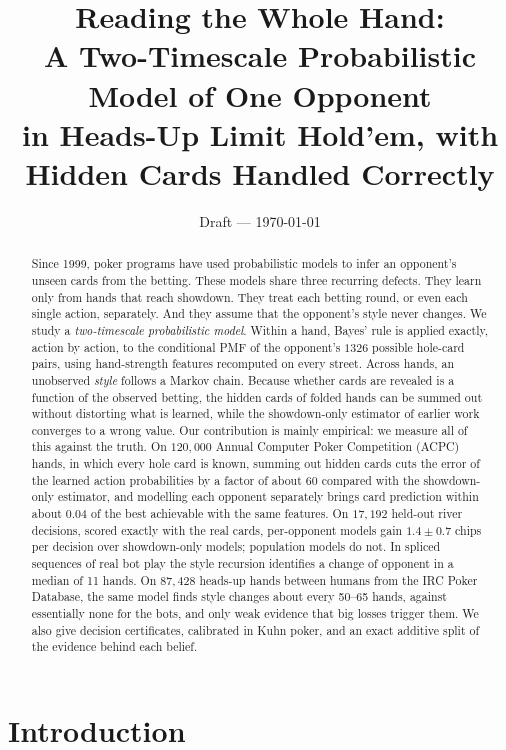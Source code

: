 \documentclass[11pt,a4paper]{article}
\title{Reading the Whole Hand:\\
A Two-Timescale Probabilistic Model of One Opponent\\
in Heads-Up Limit Hold'em, with Hidden Cards Handled Correctly}
\author{Draft --- \today}
\date{}
\newcommand{\1}{\mathbf{1}}
\begin{document}
\maketitle

\begin{abstract}
Since 1999, poker programs have used probabilistic models to infer an opponent's
unseen cards from the betting. These models share three recurring defects.
They learn only from hands that reach showdown. They treat each betting round,
or even each single action, separately. And they assume that the opponent's
style never changes. We study a \emph{two-timescale probabilistic model}.
Within a hand, Bayes' rule is applied exactly, action by action, to the
conditional PMF of the opponent's $1326$ possible hole-card pairs, using
hand-strength features recomputed on every street. Across hands, an unobserved
\emph{style} follows a Markov chain. Because whether cards are revealed is a
function of the observed betting, the hidden cards of folded hands can be
summed out without distorting what is learned, while the showdown-only
estimator of earlier work converges to a wrong value. Our contribution is
mainly empirical: we measure all of this against the truth. On $120{,}000$
Annual Computer Poker Competition (ACPC) hands, in which every hole card is
known, summing out hidden cards cuts the error of the learned action
probabilities by a factor of about 60 compared with the showdown-only estimator, and
modelling each opponent separately brings card prediction within about $0.04$ of
the best achievable with the same features. On $17{,}192$ held-out river
decisions, scored exactly with the real cards, per-opponent models gain
$1.4\pm0.7$ chips per decision over showdown-only models; population models do
not. In spliced sequences of real bot play the style recursion identifies a
change of opponent in a median of 11 hands. On $87{,}428$ heads-up hands
between humans from the IRC Poker Database, the same model finds style changes
about every 50--65 hands, against essentially none for the bots, and only
weak evidence that big losses trigger them. We also give decision
certificates, calibrated in Kuhn poker, and an exact additive split of the
evidence behind each belief.
\end{abstract}

\section{Introduction}
\end{document}
